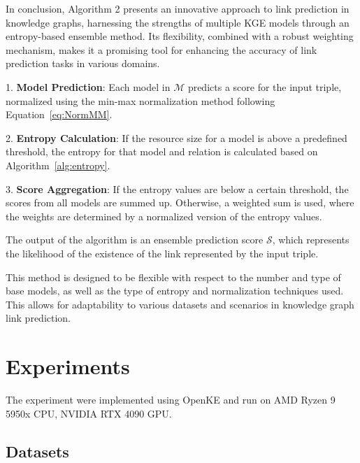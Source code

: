 \documentclass{article}
\begin{document}
In conclusion, Algorithm 2 presents an innovative approach to link prediction in knowledge graphs, harnessing the strengths of multiple KGE models through an entropy-based ensemble method. Its flexibility, combined with a robust weighting mechanism, makes it a promising tool for enhancing the accuracy of link prediction tasks in various domains.

1. \textbf{Model Prediction}: Each model in $\mathcal{M}$ predicts a score for the input triple, normalized using the min-max normalization method following Equation~\ref{eq:NormMM}.

2. \textbf{Entropy Calculation}: If the resource size for a model is above a predefined threshold, the entropy for that model and relation is calculated based on Algorithm~\ref{alg:entropy}.

3. \textbf{Score Aggregation}: If the entropy values are below a certain threshold, the scores from all models are summed up. Otherwise, a weighted sum is used, where the weights are determined by a normalized version of the entropy values. 

\vspace{10pt}

The output of the algorithm is an ensemble prediction score $\mathcal{S}$, which represents the likelihood of the existence of the link represented by the input triple.

This method is designed to be flexible with respect to the number and type of base models, as well as the type of entropy and normalization techniques used. This allows for adaptability to various datasets and scenarios in knowledge graph link prediction.









\section{Experiments}

The experiment were implemented using OpenKE and run on AMD Ryzen 9 5950x CPU, NVIDIA RTX 4090 GPU.

\subsection{Datasets}
\end{document}
